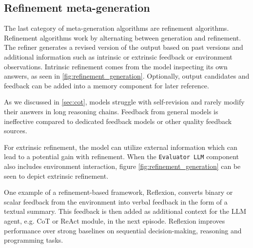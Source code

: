 \subsection{Refinement meta-generation} \label{sec:refine}
The last category of meta-generation algorithms are refinement algorithms. Refinement algorithms work by alternating between generation and refinement.
The refiner generates a revised version of the output based on past versions and additional information such as intrinsic or extrinsic feedback or environment observations\cite{welleck2024decodingmetagenerationinferencetimealgorithms}. 
Intrinsic refinement comes from the model inspecting its own answers, as seen in \ref{fig:refinement_generation}. Optionally, output candidates and feedback can be added into a memory component for later reference.

As we discussed in \ref{sec:cot}, models struggle with self-revision and rarely modify their answers in long reasoning chains.
Feedback from general models is ineffective compared to dedicated feedback models or other quality feedback sources\cite{wang2025dedicatedfeedbackeditmodels}. 

For extrinsic refinement, the model can utilize external information which can lead to a potential gain with refinement\cite{welleck2024decodingmetagenerationinferencetimealgorithms}.
When the \texttt{Evaluator LLM} component also includes environment interaction, figure \ref{fig:refinement_generation} can be seen to depict extrinsic refinement.

One example of a refinement-based framework, Reflexion\cite{shinn2023reflexionlanguageagentsverbal}, converts binary or scalar feedback from the environment into verbal feedback in the form 
of a textual summary. This feedback is then added as additional context for the LLM agent, e.g. CoT or ReAct module, in the next episode. 
Reflexion improves performance over strong baselines on sequential decision-making, reasoning and programming tasks\cite{shinn2023reflexionlanguageagentsverbal}.


